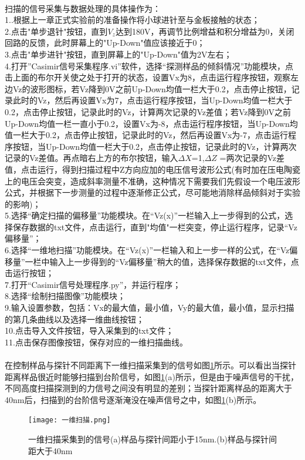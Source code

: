 \paragraph*{}
扫描的信号采集与数据处理的具体操作为：
\\1..根据上一章正式实验前的准备操作将小球进针至与金板接触的状态；
\\2.点击"单步退针"按钮，直到$V_z$达到180V，再调节比例增益和积分增益为0，关闭回路的反馈，此时屏幕上的"Up-Down"值应该接近于0；
\\3.点击"单步进针"按钮，直到屏幕上的"Up-Down"值为2V左右；
\\4.打开”Casimir信号采集程序.vi”软件，选择“探测样品的倾斜情况”功能模块，点击上面的布尔开关使之处于打开的状态，设置Vx为8，点击运行程序按钮，观察左边Vz的波形图标，若Vz降到0V之前Up-Down均值一栏大于0.2，点击停止按钮，记录此时的Vz，然后再设置Vx为7，点击运行程序按钮，当Up-Down均值一栏大于0.2，点击停止按钮，记录此时的Vz，计算两次记录的Vz差值；若Vz降到0V之前Up-Down均值一栏一直小于0.2，设置Vx为-8，点击运行程序按钮，当Up-Down均值一栏大于0.2，点击停止按钮，记录此时的Vz，然后再设置Vx为-7，点击运行程序按钮，当Up-Down均值一栏大于0.2，点击停止按钮，记录此时的Vz，计算两次记录的Vz差值。再点暗右上方的布尔按钮，输入$\Delta X$=1,$\Delta Z$ =两次记录的Vz差值，点击运行，得到扫描过程中Z方向应加的电压信号波形公式(有时加在压电陶瓷上的电压会突变，造成斜率测量不准确，这种情况下需要我们先假设一个电压波形公式，并根据下一步测量的过程中逐渐修正公式，尽可能地消除样品倾斜对于实验的影响)；
\\5.选择“确定扫描的偏移量”功能模块。在“Vz(x)”一栏输入上一步得到的公式，选择保存数据的txt文件，点击运行，直到"均值"一栏突变，停止运行程序，记录“Vz偏移量”；
\\6.选择“一维地扫描”功能模块。在“Vz(x)”一栏输入和上一步一样的公式，在“Vz偏移量”一栏中输入上一步得到的“Vz偏移量”稍大的值，选择保存数据的txt文件，点击运行按钮；
\\7.打开“Casimir信号处理程序.py”，并运行程序；
\\8.选择“绘制扫描图像”功能模块；
\\9.输入设置参数，包括：Vx的最大值，最小值，Vy的最大值，最小值，显示扫描的第几条曲线以及选择一维曲线按钮；
\\10.点击导入文件按钮，导入采集到的txt文件；
\\11.点击保存图像按钮，保存对应的一维扫描曲线。
\paragraph*{}
在控制样品与探针不同距离下一维扫描采集到的信号如图\ref{fig:16}所示。可以看出当探针距离样品很近时能够扫描到台阶信号，如图\ref{fig:16}(a)所示，但是由于噪声信号的干扰，不同高度扫描探测到的力信号之间没有明显的差别；当探针距离样品的距离大于40nm后，扫描到的台阶信号逐渐淹没在噪声信号之中，如图\ref{fig:16}(b)所示。
\begin{figure}[h]
	\centering
	\texttt{[image: 一维扫描.png]}
	\caption{一维扫描采集到的信号(a)样品与探针间距小于15nm.(b)样品与探针间距大于40nm}
	\label{fig:16}
\end{figure}
